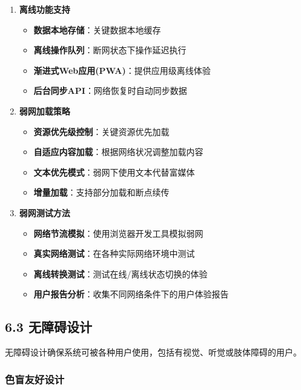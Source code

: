 \begin{enumerate}
\def\labelenumi{\arabic{enumi}.}
\tightlist
\item
  \textbf{离线功能支持}

  \begin{itemize}
  \tightlist
  \item
    \textbf{数据本地存储}：关键数据本地缓存
  \item
    \textbf{离线操作队列}：断网状态下操作延迟执行
  \item
    \textbf{渐进式Web应用(PWA)}：提供应用级离线体验
  \item
    \textbf{后台同步API}：网络恢复时自动同步数据
  \end{itemize}
\item
  \textbf{弱网加载策略}

  \begin{itemize}
  \tightlist
  \item
    \textbf{资源优先级控制}：关键资源优先加载
  \item
    \textbf{自适应内容加载}：根据网络状况调整加载内容
  \item
    \textbf{文本优先模式}：弱网下使用文本代替富媒体
  \item
    \textbf{增量加载}：支持部分加载和断点续传
  \end{itemize}
\item
  \textbf{弱网测试方法}

  \begin{itemize}
  \tightlist
  \item
    \textbf{网络节流模拟}：使用浏览器开发工具模拟弱网
  \item
    \textbf{真实网络测试}：在各种实际网络环境中测试
  \item
    \textbf{离线转换测试}：测试在线/离线状态切换的体验
  \item
    \textbf{用户报告分析}：收集不同网络条件下的用户体验报告
  \end{itemize}
\end{enumerate}

\subsection{6.3 无障碍设计}\label{ux65e0ux969cux788dux8bbeux8ba1}

无障碍设计确保系统可被各种用户使用，包括有视觉、听觉或肢体障碍的用户。

\subsubsection{色盲友好设计}\label{ux8272ux76f2ux53cbux597dux8bbeux8ba1}


